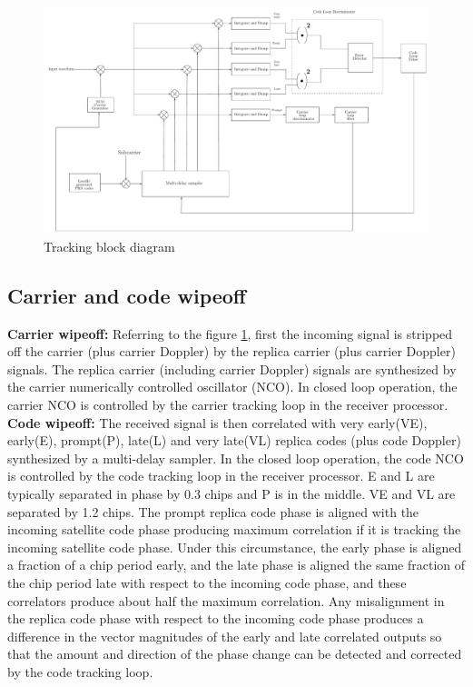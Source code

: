 \begin{normalsize}
\begin{figure}[ht]
\centering
\includegraphics[width=1.25\columnwidth]{figs/tracking}
\centering
\captionsetup{justification=centering}
\caption{Tracking block diagram}
\label{fig:tracking}
\end{figure}
\end{normalsize}
\subsection{Carrier and code wipeoff}
\textbf{Carrier wipeoff: }Referring to the figure \ref{fig:tracking}, first the incoming signal is stripped off the carrier (plus carrier Doppler) by the replica carrier (plus carrier Doppler) signals. The replica carrier (including carrier Doppler) signals are synthesized by the carrier numerically controlled oscillator (NCO). In closed loop operation, the carrier NCO is controlled by the carrier tracking loop in the receiver processor.
\\
\textbf{Code wipeoff: } The received signal is then correlated with very early(VE), early(E), prompt(P), late(L) and very late(VL) replica codes (plus code Doppler) synthesized by a multi-delay sampler. In the closed loop operation, the code NCO is controlled by the code tracking loop in the receiver processor. E and L are typically separated in phase by 0.3 chips and P is in the middle. VE and VL are separated by 1.2 chips. The prompt replica code phase is aligned with the incoming satellite code phase producing maximum correlation if it is tracking the incoming satellite code phase. Under this circumstance, the early phase is aligned a fraction of a chip period early, and the late phase is aligned the same fraction of the chip period late with respect to the incoming  code phase, and these correlators produce about half the maximum correlation. Any misalignment in the replica code phase with respect to the incoming code phase produces a difference in the vector magnitudes of the early and late correlated outputs so that the amount and direction of the phase change can be detected and corrected by the code tracking loop.
